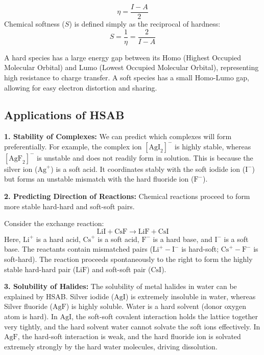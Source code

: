 \documentclass[12pt,a4paper]{article}
\begin{document}
\begin{tcolorbox}[formulabox, title={Chemical Hardness and Softness Equations}]
  \[ \eta = \frac{I - A}{2} \]
  Chemical softness ($S$) is defined simply as the reciprocal of hardness:
  \[ S = \frac{1}{\eta} = \frac{2}{I - A} \]
\end{tcolorbox}
A hard species has a large energy gap between its Homo (Highest Occupied Molecular Orbital) and Lumo (Lowest Occupied Molecular Orbital), representing high resistance to charge transfer. A soft species has a small Homo-Lumo gap, allowing for easy electron distortion and sharing.

\subsection{Applications of HSAB}

\textbf{1. Stability of Complexes:}
We can predict which complexes will form preferentially.
For example, the complex ion $[\text{AgI}_2]^-$ is highly stable, whereas $[\text{AgF}_2]^-$ is unstable and does not readily form in solution. This is because the silver ion ($\text{Ag}^+$) is a soft acid. It coordinates stably with the soft iodide ion ($\text{I}^-$) but forms an unstable mismatch with the hard fluoride ion ($\text{F}^-$).

\textbf{2. Predicting Direction of Reactions:}
Chemical reactions proceed to form more stable hard-hard and soft-soft pairs.
\par
Consider the exchange reaction:
\[ \text{LiI} + \text{CsF} \to \text{LiF} + \text{CsI} \]
Here, $\text{Li}^+$ is a hard acid, $\text{Cs}^+$ is a soft acid, $\text{F}^-$ is a hard base, and $\text{I}^-$ is a soft base. The reactants contain mismatched pairs ($\text{Li}^+-\text{I}^-$ is hard-soft; $\text{Cs}^+-\text{F}^-$ is soft-hard). The reaction proceeds spontaneously to the right to form the highly stable hard-hard pair ($\text{LiF}$) and soft-soft pair ($\text{CsI}$).

\textbf{3. Solubility of Halides:}
The solubility of metal halides in water can be explained by HSAB.
Silver iodide ($\text{AgI}$) is extremely insoluble in water, whereas Silver fluoride ($\text{AgF}$) is highly soluble. Water is a hard solvent (donor oxygen atom is hard).
In $\text{AgI}$, the soft-soft covalent interaction holds the lattice together very tightly, and the hard solvent water cannot solvate the soft ions effectively. In $\text{AgF}$, the hard-soft interaction is weak, and the hard fluoride ion is solvated extremely strongly by the hard water molecules, driving dissolution.
\end{document}
